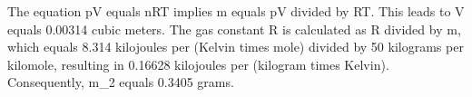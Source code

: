 The equation pV equals nRT implies m equals pV divided by RT. This leads to V equals 0.00314 cubic meters. The gas constant R is calculated as R divided by m, which equals 8.314 kilojoules per (Kelvin times mole) divided by 50 kilograms per kilomole, resulting in 0.16628 kilojoules per (kilogram times Kelvin). Consequently, m_2 equals 0.3405 grams.